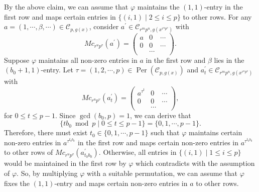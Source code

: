 \documentclass[journal,12pt,onecolumn]{IEEEtran}
\begin{document}
    By the above claim, we can assume that $\varphi$ maintains the $(1, 1)$-entry in the first row and maps certain entries in $\{(i,1)\mid 2\le i \le p\}$ to other rows. For any $a = (1,\cdots,\beta,\cdots)\in\mathcal{C}_{p,g(x)}$, consider $a^\prime\in\mathcal{C}_{r^mp^n,g(x^{r^up^v})}$ with
    \[
        Mc_{r^up^v}(a^\prime) = \begin{pmatrix}
            a & 0 & \cdots  \\
            0 & 0 & \cdots \\
              & \cdots & 
        \end{pmatrix}. 
    \]
    Suppose $\varphi$ maintains all non-zero entries in $a$ in the first row and $\beta$ lies in the $(b_0+1,1)$-entry. Let $\tau = (1,2,\cdots,p)\in \operatorname{Per}(\mathcal{C}_{p,g(x)})$ and $a^\prime_t\in\mathcal{C}_{r^mp^n,g(x^{r^up^v})}$ with 
    \[
        Mc_{r^up^v}(a^\prime_t) = \begin{pmatrix}
            a^{\tau^t} & 0 & \cdots  \\
            0 & 0 & \cdots \\
              & \cdots & 
        \end{pmatrix},
    \]
    for $0\le t\le p-1$. Since $\gcd(b_0,p) = 1$, we can derive that
    \[
        \{tb_0\bmod{p}\mid 0\le t\le p-1\} = \{0,1,\cdots,p-1\}. 
    \]
    Therefore, there must exist $t_0\in\{0,1,\cdots,p-1\}$ such that $\varphi$ maintains certain non-zero entries in $a^{\tau^{t_0b_0}}$ in the first row and maps certain non-zero entries in $a^{\tau^{t_0b_0}}$ to other rows of $Mc_{r^up^v}(a^\prime_{t_0b_0})$. Otherwise, all entries in $\{(i,1)\mid 1\le i \le p\}$ would be maintained in the first row by $\varphi$ which contradicts with the assumption of $\varphi$. So, by multiplying $\varphi$ with a suitable permutation, we can assume that $\varphi$ fixes the $(1, 1)$-entry and maps certain non-zero entries in $a$ to other rows. 
\end{document}
